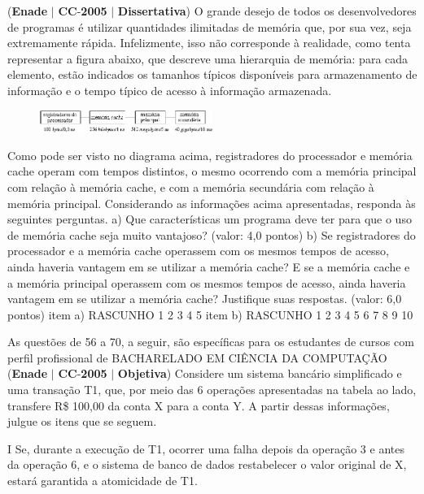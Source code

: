 \documentclass{exam}
\begin{document}
\begin{questions}
\question (\textbf{Enade} $|$ \textbf{CC}-\textbf{2005} $|$ \textbf{Dissertativa})
O grande desejo de todos os desenvolvedores de programas é utilizar quantidades ilimitadas de memória que, por sua vez,
seja extremamente rápida. Infelizmente, isso não corresponde à realidade, como tenta representar a figura abaixo, que descreve
uma hierarquia de memória: para cada elemento, estão indicados os tamanhos típicos disponíveis para armazenamento de
informação e o tempo típico de acesso à informação armazenada.


\begin{figure}[H]
	\begin{center}
		\includegraphics[width=0.5\textwidth]{CIENCIA_DA_COMPUTACAO_Prova2005-utf8_figuras/fig-0019.jpg}
	\end{center}
\end{figure}

Como pode ser visto no diagrama acima, registradores do processador e memória cache operam com tempos distintos, o
mesmo ocorrendo com a memória principal com relação à memória cache, e com a memória secundária com relação à memória
principal.
Considerando as informações acima apresentadas, responda às seguintes perguntas.
a) Que características um programa deve ter para que o uso de memória cache seja muito vantajoso? (valor: 4,0 pontos)
b) Se registradores do processador e a memória cache operassem com os mesmos tempos de acesso, ainda haveria vantagem em se
utilizar a memória cache? E se a memória cache e a memória principal operassem com os mesmos tempos de acesso, ainda haveria
vantagem em se utilizar a memória cache? Justifique suas respostas. (valor: 6,0 pontos)
item a) RASCUNHO
1
2
3
4
5
item b) RASCUNHO
1
2
3
4
5
6
7
8
9
10

As questões de 56 a 70, a seguir, são específicas para os estudantes de cursos com perfil profissional de
BACHARELADO EM CIÊNCIA DA COMPUTAÇÃO
\question (\textbf{Enade} $|$ \textbf{CC}-\textbf{2005} $|$ \textbf{Objetiva})
Considere um sistema bancário
simplificado e uma transação T1,
que, por meio das 6 operações
apresentadas na tabela ao lado,
transfere R\$ 100,00 da conta X
para a conta Y. A partir dessas
informações, julgue os itens que se
seguem.

I Se, durante a execução de T1,
ocorrer uma falha depois da
operação 3 e antes da operação
6, e o sistema de banco de dados
restabelecer o valor original
de X, estará garantida a atomicidade de T1. 


\end{questions}
\end{document}

